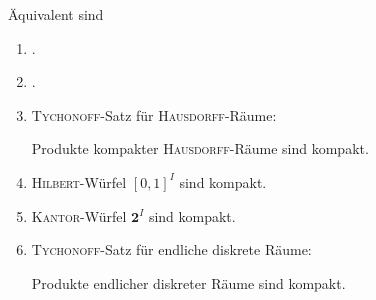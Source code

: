 \begin{thm}
  \label{thm:pitequivalence}
  Äquivalent sind
  \begin{enumerate}[(1)]
    \item \PIT.
    \item \UFT.
    \item \textsc{Tychonoff}-Satz für \textsc{Hausdorff}-Räume: 
      \begin{addmargin}[2em]{2em}%
        Produkte kompakter \textsc{Hausdorff}-Räume sind kompakt.
      \end{addmargin}
    \item \textsc{Hilbert}-Würfel $[0,1]^I$ sind kompakt.
    \item \textsc{Kantor}-Würfel $\mathbf{2}^I$ sind kompakt.
    \item \textsc{Tychonoff}-Satz für endliche diskrete Räume: 
      \begin{addmargin}[2em]{2em}%
        Produkte endlicher diskreter Räume sind kompakt.
      \end{addmargin}
  \end{enumerate}
\end{thm}

